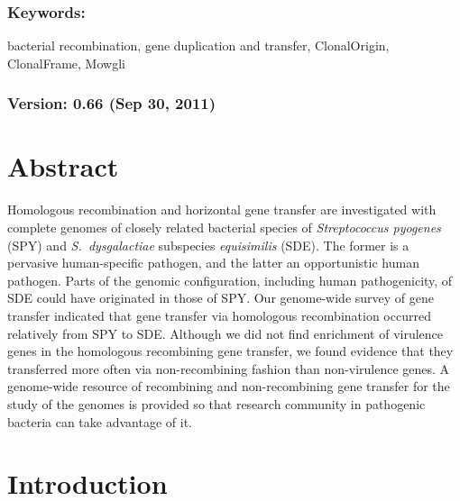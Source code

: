 \documentclass[english]{article}
\begin{document}
\subsubsection*{Keywords:}

bacterial recombination, gene duplication and transfer, ClonalOrigin,
ClonalFrame, Mowgli


\subsubsection*{Version: 0.66 (Sep 30, 2011) \clearpage{}}


\section*{Abstract}
Homologous recombination and horizontal gene transfer are investigated with
complete genomes of closely related bacterial species of \textit{Streptococcus
pyogenes} (SPY) and \textit{S.\ dysgalactiae} subspecies \textit{equisimilis}
(SDE).  The former is a pervasive human-specific pathogen, and the latter an
opportunistic human pathogen.  Parts of the genomic configuration, including
human pathogenicity, of SDE could have originated in those of SPY.  Our
genome-wide survey of gene transfer indicated that gene transfer via homologous
recombination occurred relatively from SPY to SDE.  Although we did not find
enrichment of virulence genes in the homologous recombining gene transfer, we
found evidence that they transferred more often via non-recombining fashion than
non-virulence genes.  A genome-wide resource of recombining and non-recombining
gene transfer for the study of the genomes is provided so that research
community in pathogenic bacteria can take advantage of it.

\clearpage{}

\section{Introduction}
\end{document}
